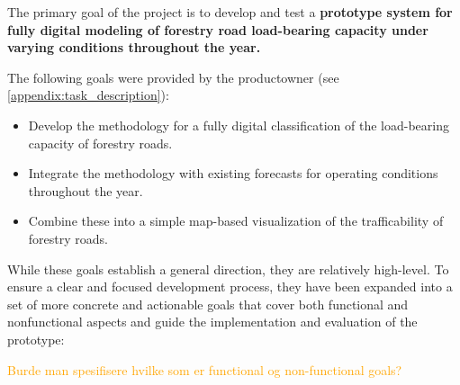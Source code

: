 The primary goal of the project is to develop and test a \textbf{prototype system for fully digital modeling of forestry road load-bearing capacity under varying conditions throughout the year.} 

The following goals were provided by the \Gls{productowner} (see \autoref{appendix:task_description}):
\begin{itemize}
    \item Develop the methodology for a fully digital classification of the load-bearing capacity of forestry roads.
    \item Integrate the methodology with existing forecasts for operating conditions throughout the year.
    \item Combine these into a simple map-based visualization of the trafficability of forestry roads.
\end{itemize}

While these goals establish a general direction, they are relatively high-level. To ensure a clear and focused development process, they have been expanded into a set of more concrete and actionable goals that cover both functional and nonfunctional aspects and guide the implementation and evaluation of the prototype: 

\textcolor{orange}{Burde man spesifisere hvilke som er functional og non-functional goals?}

